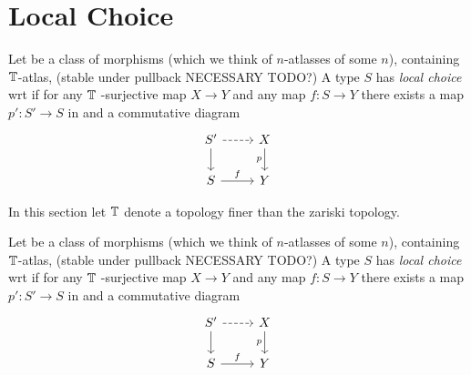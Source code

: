 
\section{Local Choice}
\begin{definition}
	Let \Cov be a class of morphisms (which we think of $n$-atlasses of some $n$), containing $\mathbb{T}$-atlas, (stable under pullback NECESSARY TODO?)
	A type $S$ has \emph{local choice} wrt \Cov if for any $\mathbb{T}$ -surjective map $X \to Y$ and any map $f : S \to Y$ there exists a map  $p' : S' \to S$ in \Cov and a commutative diagram
	\[\begin{tikzcd}
		{S'} & X \\
		S & Y
		\arrow[dashed, from=1-1, to=1-2]
		\arrow[from=1-1, to=2-1]
		\arrow["p"', from=1-2, to=2-2]
		\arrow["f",from=2-1, to=2-2]
	\end{tikzcd}\]
\end{definition}
In this section let $\mathbb{T}$ denote a topology finer than the zariski topology.
\begin{definition}
	Let \Cov be a class of morphisms (which we think of $n$-atlasses of some $n$), containing $\mathbb{T}$-atlas, (stable under pullback NECESSARY TODO?)
	A type $S$ has \emph{local choice} wrt \Cov if for any $\mathbb{T}$ -surjective map $X \to Y$ and any map $f : S \to Y$ there exists a map  $p' : S' \to S$ in \Cov and a commutative diagram
	\[\begin{tikzcd}
		{S'} & X \\
		S & Y
		\arrow[dashed, from=1-1, to=1-2]
		\arrow[from=1-1, to=2-1]
		\arrow["p"', from=1-2, to=2-2]
		\arrow["f",from=2-1, to=2-2]
	\end{tikzcd}\]
\end{definition}
